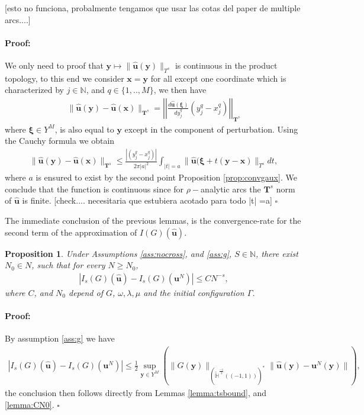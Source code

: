\documentclass{article}
\newtheorem{proposition}[theorem]{Proposition}
\newenvironment{proof}{\paragraph{Proof:}}{\hfill$\square$}
\newcommand{\todo}[1]{{\color{red}[#1]}}
\newcommand{\IN}{{\mathbb N}}
\begin{document}
\todo{esto no funciona, probalmente tengamos que usar las cotas del paper de multiple arcs....}

\begin{proof}
We only need to proof that $\mathbf{y} \mapsto \| \widehat{\mathbf{u}}(\mathbf{y}) \|_{T^s}$ is continuous in the product topology, to this end we consider $\mathbf{x} = \mathbf{y}$ for all except one coordinate which is characterized by $j \in \IN$, and $q \in \{1,..,M\}$, we then have
\begin{align*}
\|\widehat{\mathbf{u}}(\mathbf{y})  - \widehat{\mathbf{u}}(\mathbf{x})\|_{\mathbf{T}^s}  = \left\vert\left\vert \frac{d\widehat{\mathbf{u}}(\mathbf{\xi}) }{d y^q_j} (y^q_j-x^q_j) \right\vert \right\vert_{\mathbf{T}^s}
\end{align*}
where $\mathbf{\xi} \in Y^M$, is also equal to $\mathbf{y}$ except in the component of perturbation. Using the Cauchy formula we obtain
\begin{align*}
\|\widehat{\mathbf{u}}(\mathbf{y})  - \widehat{\mathbf{u}}(\mathbf{x})\|_{\mathbf{T}^s}  \leq \frac{|(y^q_j-x^q_j)|}{2 \pi |a|^2}
\int_{|t| = a} 
\|\widehat{\mathbf{u}}(\mathbf{\xi}+t(\mathbf{y}-\mathbf{x})\|_{T^s}
dt,
\end{align*}
where $a$ is ensured to exist by the second point Proposition \ref{prop:convgaux}. We conclude that the function is continuous since for $\rho-$analytic arcs the $\mathbf{T}^s$ norm of $\widehat{\mathbf{u}}$ is finite. 
\todo{check.... necesitaria que estubiera acotado para todo |t| =a} 
\end{proof}

The immediate conclusion of the previous lemmas, 
is the convergence-rate for the second term of the approximation of $I(G)(\widehat{\mathbf{u}})$.
\begin{proposition}
Under Assumptions \ref{ass:nocross}, and \ref{ass:g}, $S \in \IN$, there exist $N_0 \in N$, such that for every $N\geq N_0$, 
\begin{align*}
|I_s(G)(\widehat{\mathbf{u}}) -
I_s(G)(\mathbf{u}^N)| \leq C N^{-s},
\end{align*} 
where $C$, and $N_0$ depend of $G$, $\omega, \lambda,\mu$ and the initial configuration $\Gamma$.
\end{proposition}
\begin{proof}
By assumption \ref{ass:g} we have 
\begin{align*}
|I_s(G)(\widehat{\mathbf{u}}) -
I_s(G)(\mathbf{u}^N)| \leq \frac{1}{2} \sup_{\mathbf{y}\in Y^M}\left(\|  G(\mathbf{y})\|_{\left(\widetilde{\mathbb{H}}^{\frac{-1}{2}}((-1,1))\right)^*} 
\|\widehat{\mathbf{u}}(\mathbf{y}) -\mathbf{u}^N(\mathbf{y})\|
\right),
\end{align*}
the conclusion then follows directly from Lemmas \ref{lemma:tsbound}, and \ref{lemma:CN0}.
\end{proof}
\end{document}
